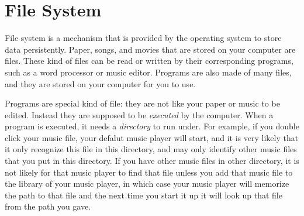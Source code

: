 \documentclass[../main.tex]{subfiles}
\begin{document}
    \section{File System}
    File system is a mechanism that is provided by the operating system to store
    data persistently. Paper, songs, and movies that are stored on your computer
    are files. These kind of files can be read or written by their corresponding
    programs, such as a word processor or music editor. Programs are also made
    of many files, and they are stored on your computer for you to use.

    Programs are special kind of file: they are not like your paper or music to
    be edited. Instead they are supposed to be \emph{executed} by the computer.
    When a program is executed, it needs a \emph{directory} to run under. For
    example, if you double click your music file, your defalut music player will
    start, and it is very likely that it only recognize this file in this directory,
    and may only identify other music files that you put in this directory. If you
    have other music files in other directory, it is not likely for that music
    player to find that file unless you add that music file to the library of
    your music player, in which case your music player will memorize the path
    to that file and the next time you start it up it will look up that file
    from the path you gave.
\end{document}
